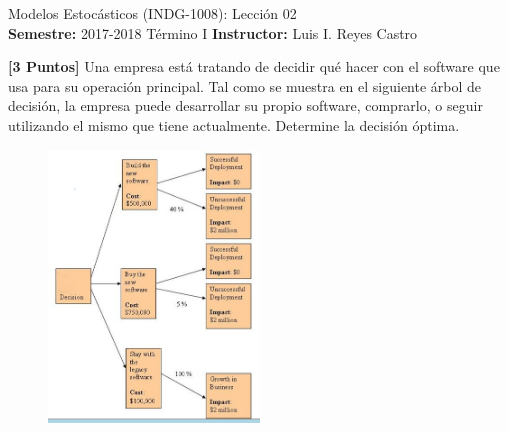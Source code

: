 \documentclass[ a4paper, twoside, 11pt]{article}
\newcommand{\numero}{02}
\begin{document}
\allowdisplaybreaks

\begin{center}
\Large Modelos Estoc\'asticos (INDG-1008): Lecci\'on \numero \\[1ex]
\small \textbf{Semestre:} 2017-2018 T\'ermino I \qquad
\textbf{Instructor:} Luis I. Reyes Castro
\end{center}
\halfskip



\begin{problem}
\textbf{[3 Puntos]} Una empresa est\'a tratando de decidir qu\'e hacer con el software que usa para su operaci\'on principal. Tal como se muestra en el siguiente \'arbol de decisi\'on, \linebreak la empresa puede desarrollar su propio software, comprarlo, o seguir utilizando el mismo que tiene actualmente. Determine la decisi\'on \'optima. 

\begin{figure}[htb]
\centering
\includegraphics[width=0.5\textwidth]{problema_arbol-decision.jpg}
\end{figure}

\end{problem}
\vspace{\baselineskip}
\end{document}
